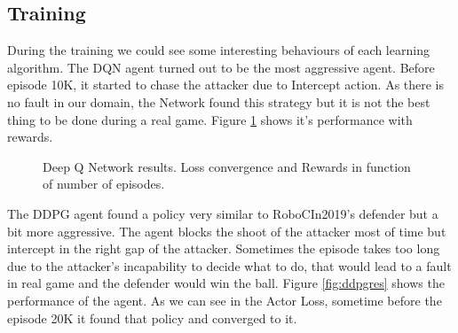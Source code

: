 \subsection{Training}
During the training we could see some interesting behaviours of each learning algorithm. The DQN agent turned out to be the most aggressive agent. Before episode 10K, it started to chase the attacker due to Intercept action. As there is no fault in our domain, the Network found this strategy but it is not the best thing to be done during a real game. Figure \ref{fig:dqnres} shows it's performance with rewards.
\begin{figure}[H]
    \centering
    \qquad
    \qquad
        \caption{Deep Q Network results. Loss convergence and Rewards in function of number of episodes.}
    \label{fig:dqnres}
\end{figure}

The DDPG agent found a policy very similar to RoboCIn2019's defender but a bit more aggressive. The agent blocks the shoot of the attacker most of time but intercept in the right gap of the attacker. Sometimes the episode takes too long due to the attacker's incapability to decide what to do, that would lead to a fault in real game and the defender would win the ball. Figure \ref{fig:ddpgres} shows the performance of the agent. As we can  see in the Actor Loss, sometime before the episode 20K it found that policy and converged to it.

